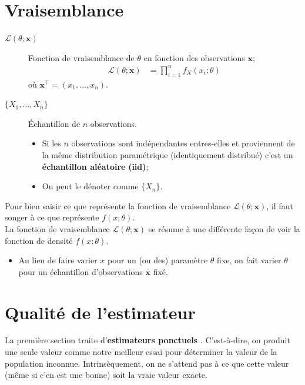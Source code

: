 \documentclass[10pt, french]{article}
\begin{document}
\begin{multicols*}{2}
\columnbreak
\section{Vraisemblance}\label{sec:likelihood}
\begin{distributions}[Notation]
\begin{description}
	\item[$\mathcal{L}(\theta; \bm{x})$]	Fonction de vraisemblance de $\theta$ en fonction des observations $\bm{x}$;
		\begin{align*}
		\mathcal{L}(\theta; \bm{x})
		&=	\prod_{i	=	1}^{n}	f_{X}(x_{i} ; \theta)
		\end{align*}
		où $\bm{x}^{\top}	=	(x_{1}, \dots, x_{n})$.
	\item[$\{X_{1}, \dots, X_{n}\}$]	Échantillon de $n$ observations.
		\begin{itemize}[leftmargin = *]
		\item	Si les $n$ observations sont indépendantes entres-elles et proviennent de la même distribution paramétrique (identiquement distribué) c'est un \textbf{échantillon aléatoire} \textbf{(iid)};
		\item	On peut le dénoter comme $\{X_{n}\}$.
		\end{itemize}
\end{description}
\end{distributions}

Pour bien saisir ce que représente la fonction de vraisemblance $\mathcal{L}(\theta; \bm{x})$, il faut songer à ce que représente $f(x; \theta)$. \\
La fonction de vraisemblance $\mathcal{L}(\theta; \bm{x})$ se résume à une différente façon de voir la fonction de densité $f(x ; \theta)$. 
\begin{itemize}
	\item	Au lieu de faire varier $x$ pour un (ou des) paramètre $\theta$ fixe, on fait varier $\theta$ pour un échantillon d'observations $\bm{x}$ fixé.
\end{itemize}



\columnbreak
\section{Qualité de l'estimateur}

La première section traite d'\guillemotleft \textbf{estimateurs ponctuels} \guillemotright. 
C'est-à-dire, on produit une seule valeur comme notre meilleur essai pour déterminer la valeur de la population inconnue.
Intrinsèquement, on ne s'attend pas à ce que cette valeur (même si c'en est une bonne) soit la vraie valeur exacte.\\


\end{multicols*}
\end{document}
